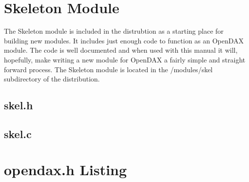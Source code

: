 \appendix



\chapter{Skeleton Module}
The Skeleton module is included in the distrubtion as a starting place for building new modules.  It includes just enough code to function as an OpenDAX module.  The code is well documented and when used with this manual it will, hopefully, make writing a new module for OpenDAX a fairly simple and straight forward process.  The Skeleton module is located in the /modules/skel subdirectory of the distribution.

\section{skel.h}
\begin{small}

\end{small}
\section{skel.c}
\begin{small}

\end{small}


\chapter{opendax.h Listing}
\begin{small}

\end{small}

%

\printindex

